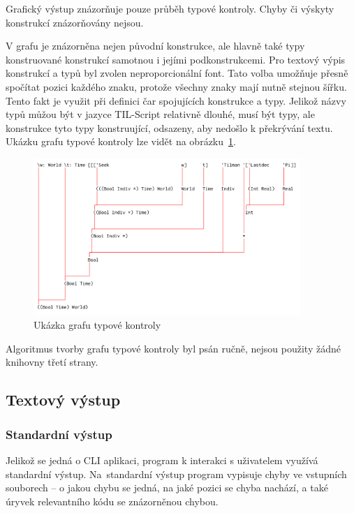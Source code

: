 \documentclass{article}
\begin{document}
Grafický výstup znázorňuje pouze průběh typové kontroly. Chyby či výskyty konstrukcí znázorňovány nejsou.

V grafu je znázorněna nejen původní konstrukce, ale hlavně také typy konstruované konstrukcí samotnou i jejími
podkonstrukcemi. Pro textový výpis konstrukcí a typů byl zvolen neproporcionální font. Tato volba umožňuje přesně
spočítat pozici každého znaku, protože všechny znaky mají nutně stejnou šířku. Tento fakt je využit při definici
čar spojujících konstrukce a typy. Jelikož názvy typů můžou být v jazyce TIL-Script relativně dlouhé, musí být
typy, ale konstrukce tyto typy konstruující, odsazeny, aby nedošlo k překrývání textu. Ukázku grafu
typové kontroly lze vidět na obrázku~\ref{fig:graph}.

\begin{figure}
    \centering
    \includegraphics[width=0.9\textwidth]{graph.png}
    \caption{Ukázka grafu typové kontroly}\label{fig:graph}
\end{figure}

Algoritmus tvorby grafu typové kontroly byl psán ručně, nejsou použity žádné knihovny třetí strany.

\subsection{Textový výstup}

\subsubsection{Standardní výstup}

Jelikož se jedná o CLI aplikaci, program k interakci s uživatelem využívá standardní výstup. Na~standardní
výstup program vypisuje chyby ve vstupních souborech -- o jakou chybu se jedná, na jaké pozici se chyba nachází,
a také úryvek relevantního kódu se znázorněnou chybou.
\end{document}
